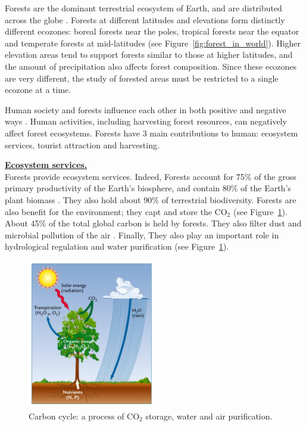 Forests are the dominant terrestrial ecosystem of Earth, and are distributed across the globe \citep{pan2013structure}. Forests at different latitudes and elevations form distinctly different ecozones: boreal forests near the poles, tropical forests near the equator and temperate forests at mid-latitudes (see Figure~\ref{fig:forest_in_world}). Higher elevation areas tend to support forests similar to those at higher latitudes, and the amount of precipitation also affects forest composition. Since these ecozones are very different, the study of forested areas must be restricted to a single ecozone at a time.


Human society and forests influence each other in both positive and negative ways \citep{vogt2006global}. Human activities, including harvesting forest resources, can negatively affect forest ecosystems. Forests have 3 main contributions to human: ecosystem services, tourist attraction and harvesting.

\textbf{\underline{Ecosystem services.}}\\
Forests provide ecosystem services. Indeed, Forests account for 75\% of the gross primary productivity of the Earth's biosphere, and contain 80\% of the Earth's plant biomass \citep{pan2013structure}. They also hold about 90\% of terrestrial biodiversity. Forests are also benefit for the environment; they capt and store the CO$_{2}$ \citep{fahey2010forest} (see Figure~\ref{fig:carbon_cycle}). About 45\% of the total global carbon is held by forests. They also filter dust and microbial pollution of the air \citep{smith2012air}. Finally, They also play an important role in hydrological regulation and water purification \citep{lempriere2008importance} (see Figure~\ref{fig:carbon_cycle}).

\begin{figure}[htbp]
\begin{center}
\includegraphics[width=0.5\textwidth]{Figures/carbon_cycle}
\caption{Carbon cycle: a process of CO$_{2}$ storage, water and air purification.}
\label{fig:carbon_cycle}
\end{center}
\end{figure}

